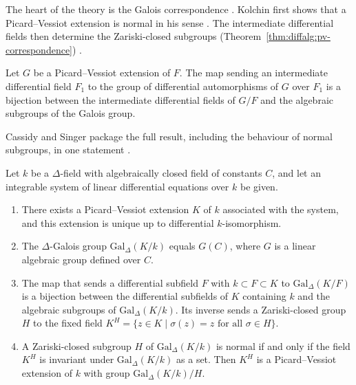 The heart of the theory is the Galois correspondence
\cite[pp.~29--33]{Kolchin1948PicardVessiot}. Kolchin first shows that a
Picard--Vessiot extension is normal in his sense
\cite[Theorem~1, p.~32]{Kolchin1948PicardVessiot}. The intermediate
differential fields then determine the Zariski-closed subgroups (Theorem~\ref{thm:diffalg:pv-correspondence})
\cite[Theorem, p.~32]{Kolchin1948PicardVessiot}.\begin{theorem}\label{thm:diffalg:pv-correspondence}
Let $G$ be a Picard--Vessiot extension of $F$. The map sending an
intermediate differential field $F_1$ to the group of differential
automorphisms of $G$ over $F_1$ is a bijection between the intermediate
differential fields of $G/F$ and the algebraic subgroups of the Galois
group.
\end{theorem}

Cassidy and Singer package the full result, including the behaviour of
normal subgroups, in one statement
\cite[Theorem~2.1, pp.~5--6]{CassidySinger2007}.

\begin{theorem}\label{thm:diffalg:pv-fundamental}
Let $k$ be a $\Delta$-field with algebraically closed field of constants
$C$, and let an integrable system of linear differential equations over
$k$ be given.

\begin{enumerate}
\item There exists a Picard--Vessiot extension $K$ of $k$ associated with
  the system, and this extension is unique up to differential
  $k$-isomorphism.
\item The $\Delta$-Galois group $\mathrm{Gal}_\Delta(K/k)$ equals
  $G(C)$, where $G$ is a linear algebraic group defined over $C$.
\item The map that sends a differential subfield $F$ with
  $k\subset F\subset K$ to $\mathrm{Gal}_\Delta(K/F)$ is a bijection
  between the differential subfields of $K$ containing $k$ and the
  algebraic subgroups of $\mathrm{Gal}_\Delta(K/k)$. Its inverse sends a
  Zariski-closed group $H$ to the fixed field
  $K^H = \{z\in K \mid \sigma(z) = z \text{ for all }\sigma\in H\}$.
\item A Zariski-closed subgroup $H$ of $\mathrm{Gal}_\Delta(K/k)$ is
  normal if and only if the field $K^H$ is invariant under
  $\mathrm{Gal}_\Delta(K/k)$ as a set. Then $K^H$ is a Picard--Vessiot
  extension of $k$ with group $\mathrm{Gal}_\Delta(K/k)/H$.
\end{enumerate}
\end{theorem}


